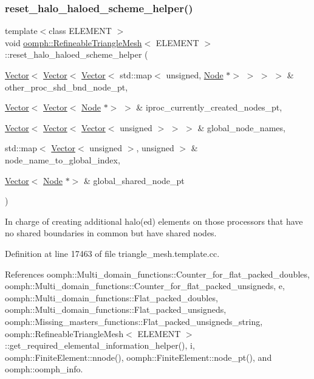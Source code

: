 \subsubsection{\texorpdfstring{reset\+\_\+halo\+\_\+haloed\+\_\+scheme\+\_\+helper()}{reset\_halo\_haloed\_scheme\_helper()}}
{\footnotesize\ttfamily template$<$class E\+L\+E\+M\+E\+NT $>$ \\
void \hyperlink{classoomph_1_1RefineableTriangleMesh}{oomph\+::\+Refineable\+Triangle\+Mesh}$<$ E\+L\+E\+M\+E\+NT $>$\+::reset\+\_\+halo\+\_\+haloed\+\_\+scheme\+\_\+helper (\begin{DoxyParamCaption}\item[{\hyperlink{classoomph_1_1Vector}{Vector}$<$ \hyperlink{classoomph_1_1Vector}{Vector}$<$ \hyperlink{classoomph_1_1Vector}{Vector}$<$ std\+::map$<$ unsigned, \hyperlink{classoomph_1_1Node}{Node} $\ast$$>$ $>$ $>$ $>$ \&}]{other\+\_\+proc\+\_\+shd\+\_\+bnd\+\_\+node\+\_\+pt,  }\item[{\hyperlink{classoomph_1_1Vector}{Vector}$<$ \hyperlink{classoomph_1_1Vector}{Vector}$<$ \hyperlink{classoomph_1_1Node}{Node} $\ast$$>$ $>$ \&}]{iproc\+\_\+currently\+\_\+created\+\_\+nodes\+\_\+pt,  }\item[{\hyperlink{classoomph_1_1Vector}{Vector}$<$ \hyperlink{classoomph_1_1Vector}{Vector}$<$ \hyperlink{classoomph_1_1Vector}{Vector}$<$ unsigned $>$ $>$ $>$ \&}]{global\+\_\+node\+\_\+names,  }\item[{std\+::map$<$ \hyperlink{classoomph_1_1Vector}{Vector}$<$ unsigned $>$, unsigned $>$ \&}]{node\+\_\+name\+\_\+to\+\_\+global\+\_\+index,  }\item[{\hyperlink{classoomph_1_1Vector}{Vector}$<$ \hyperlink{classoomph_1_1Node}{Node} $\ast$$>$ \&}]{global\+\_\+shared\+\_\+node\+\_\+pt }\end{DoxyParamCaption})\hspace{0.3cm}{\ttfamily [protected]}}



In charge of creating additional halo(ed) elements on those processors that have no shared boundaries in common but have shared nodes. 



Definition at line 17463 of file triangle\+\_\+mesh.\+template.\+cc.



References oomph\+::\+Multi\+\_\+domain\+\_\+functions\+::\+Counter\+\_\+for\+\_\+flat\+\_\+packed\+\_\+doubles, oomph\+::\+Multi\+\_\+domain\+\_\+functions\+::\+Counter\+\_\+for\+\_\+flat\+\_\+packed\+\_\+unsigneds, e, oomph\+::\+Multi\+\_\+domain\+\_\+functions\+::\+Flat\+\_\+packed\+\_\+doubles, oomph\+::\+Multi\+\_\+domain\+\_\+functions\+::\+Flat\+\_\+packed\+\_\+unsigneds, oomph\+::\+Missing\+\_\+masters\+\_\+functions\+::\+Flat\+\_\+packed\+\_\+unsigneds\+\_\+string, oomph\+::\+Refineable\+Triangle\+Mesh$<$ E\+L\+E\+M\+E\+N\+T $>$\+::get\+\_\+required\+\_\+elemental\+\_\+information\+\_\+helper(), i, oomph\+::\+Finite\+Element\+::nnode(), oomph\+::\+Finite\+Element\+::node\+\_\+pt(), and oomph\+::oomph\+\_\+info.

